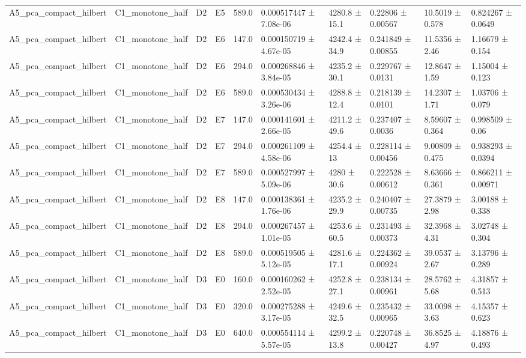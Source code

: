 \begin{table}
\begin{tabular}{llllllllll}
A5\_pca\_compact\_hilbert & C1\_monotone\_half & D2 & E5 & 589.0 & 0.000517447 ± 7.08e-06 & 4280.8 ± 15.1 & 0.22806 ± 0.00567 & 10.5019 ± 0.578 & 0.824267 ± 0.0649 \\
A5\_pca\_compact\_hilbert & C1\_monotone\_half & D2 & E6 & 147.0 & 0.000150719 ± 4.67e-05 & 4242.4 ± 34.9 & 0.241849 ± 0.00855 & 11.5356 ± 2.46 & 1.16679 ± 0.154 \\
A5\_pca\_compact\_hilbert & C1\_monotone\_half & D2 & E6 & 294.0 & 0.000268846 ± 3.84e-05 & 4235.2 ± 30.1 & 0.229767 ± 0.0131 & 12.8647 ± 1.59 & 1.15004 ± 0.123 \\
A5\_pca\_compact\_hilbert & C1\_monotone\_half & D2 & E6 & 589.0 & 0.000530434 ± 3.26e-06 & 4288.8 ± 12.4 & 0.218139 ± 0.0101 & 14.2307 ± 1.71 & 1.03706 ± 0.079 \\
A5\_pca\_compact\_hilbert & C1\_monotone\_half & D2 & E7 & 147.0 & 0.000141601 ± 2.66e-05 & 4211.2 ± 49.6 & 0.237407 ± 0.0036 & 8.59607 ± 0.364 & 0.998509 ± 0.06 \\
A5\_pca\_compact\_hilbert & C1\_monotone\_half & D2 & E7 & 294.0 & 0.000261109 ± 4.58e-06 & 4254.4 ± 13 & 0.228114 ± 0.00456 & 9.00809 ± 0.475 & 0.938293 ± 0.0394 \\
A5\_pca\_compact\_hilbert & C1\_monotone\_half & D2 & E7 & 589.0 & 0.000527997 ± 5.09e-06 & 4280 ± 30.6 & 0.222528 ± 0.00612 & 8.63666 ± 0.361 & 0.866211 ± 0.00971 \\
A5\_pca\_compact\_hilbert & C1\_monotone\_half & D2 & E8 & 147.0 & 0.000138361 ± 1.76e-06 & 4235.2 ± 29.9 & 0.240407 ± 0.00735 & 27.3879 ± 2.98 & 3.00188 ± 0.338 \\
A5\_pca\_compact\_hilbert & C1\_monotone\_half & D2 & E8 & 294.0 & 0.000267457 ± 1.01e-05 & 4253.6 ± 60.5 & 0.231493 ± 0.00373 & 32.3968 ± 4.31 & 3.02748 ± 0.304 \\
A5\_pca\_compact\_hilbert & C1\_monotone\_half & D2 & E8 & 589.0 & 0.000519505 ± 5.12e-05 & 4281.6 ± 17.1 & 0.224362 ± 0.00924 & 39.0537 ± 2.67 & 3.13796 ± 0.289 \\
A5\_pca\_compact\_hilbert & C1\_monotone\_half & D3 & E0 & 160.0 & 0.000160262 ± 2.52e-05 & 4252.8 ± 27.1 & 0.238134 ± 0.00961 & 28.5762 ± 5.68 & 4.31857 ± 0.513 \\
A5\_pca\_compact\_hilbert & C1\_monotone\_half & D3 & E0 & 320.0 & 0.000275288 ± 3.17e-05 & 4249.6 ± 32.5 & 0.235432 ± 0.00965 & 33.0098 ± 3.63 & 4.15357 ± 0.623 \\
A5\_pca\_compact\_hilbert & C1\_monotone\_half & D3 & E0 & 640.0 & 0.000554114 ± 5.57e-05 & 4299.2 ± 13.8 & 0.220748 ± 0.00427 & 36.8525 ± 4.97 & 4.18876 ± 0.493 \\

\end{tabular}
\end{table}

